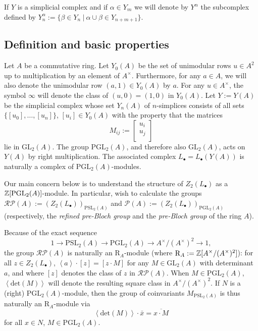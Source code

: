 \documentclass[12pt]{amsart}
\theoremstyle{definition}
\newcommand{\Z}{\Bbb{Z}}
\newcommand{\spl}[2]{\operatorname{SL}_{#1}\left(#2\right)}
\newcommand{\pspl}[2]{\mathrm{PSL}_{#1}(#2)}
\newcommand{\gl}[2]{\mathrm{GL}_{#1}(#2)}
\newcommand{\pgl}[2]{\mathrm{PGL}_{#1}(#2)}
\newcommand{\pb}[1]{\mathcal{P}(#1)}%
\newcommand{\rpb}[1]{\mathcal{RP}(#1)}%
\newcommand{\<}{\langle}
\renewcommand{\>}{\rangle}
\newcommand{\sgr}[1]{\mathrm{R}_{#1}}%
\newcommand{\an}[1]{\left\langle{#1}\right\rangle}
\begin{document}
If $Y$ is a simplicial complex and if $\alpha\in Y_m$ we will denote by $Y^\alpha$ the subcomplex defined by $Y^\alpha_n:=\{ \beta\in Y_n\ |\ \alpha\cup\beta\in Y_{n+m+1}\}$. 


\subsection{Definition and basic properties}\label{sec:yabasic}
Let $A$ be a commutative ring.  Let $Y_0(A)$ be the set of unimodular rows $u\in A^2$ up to multiplication by an element of $A^\times$. Furthermore, for any $a\in A$, we will also denote the unimodular row $(a,1)\in Y_0(A)$ by $a$. For any $u\in A^\times$, the symbol $\infty$ will denote the class of $(u,0)=(1,0)$ in $Y_0(A)$.
 Let $Y:=Y(A)$ be the simplicial complex whose set $Y_n(A)$ of $n$-simplices consists of all sets $\{ [u_0],\ldots,[u_n]\}$, $[u_i]\in Y_0(A)$ with the property that the matrices
\[
M_{ij}:=
\left[
\begin{array}{c}
u_i\\
u_j\\
\end{array}
\right]
\]
lie in $\gl{2}{A}$. The group $\pgl{2}{A}$, and therefore also $\gl{2}{A}$, acts on $Y(A)$ by right multiplication. The associated complex $L_\bullet=L_\bullet(Y(A))$ is naturally a complex of $\pgl{2}{A}$-modules.

 Our main concern below is to understand the structure of $Z_2(L_\bullet)$ as a $\Z[\pgl{2}{A}]$-module.
In particular,  wish to calculate the groups   $\rpb{A}:=(Z_2(L_\bullet))_{\pspl{2}{A}}$ and $\pb{A}:=(Z_2(L_\bullet))_{\pgl{2}{A}}$ (respectively, the \emph{refined pre-Bloch group} and the \emph{pre-Bloch group} of the ring $A$).

 Because of the exact sequence
 \[
1\to\pspl{2}{A}\to\pgl{2}{A}\to A^\times/(A^\times)^2\to 1,
\]
 the group $\rpb{A}$ is naturally an $\sgr{A}$-module (where $\sgr{A}:= \Z[A^\times/(A^\times)^2]$): for all $z\in Z_2(L_\bullet)$,  $\an{a}\cdot [z] = [z\cdot M]$ for any $M\in \gl{2}{A}$ with determinant $a$, and where 
$[z]$ denotes the class of $z$ in  $\rpb{A}$.  When $M\in\pgl{2}{A}$, $\an{\mathrm{det}(M)}$ will denote the resulting square class in $A^\times/(A^\times)^2$.  If $N$ is a (right) 
$\pgl{2}{A}$-module, then the group of coinvariants $M_{\pspl{2}{A}}$ is thus naturally an $\sgr{A}$-module via
\[
\an{\mathrm{det}(M)}\cdot\bar{x}=\overline{x\cdot M}
\]
for all $x\in N$, $M\in \pgl{2}{A}$.
\end{document}
